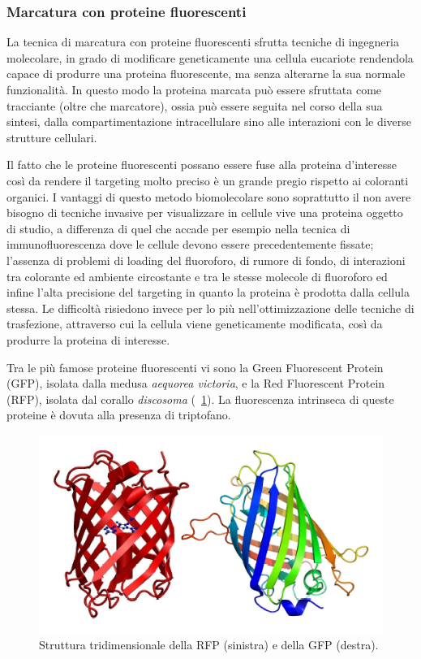 \subsubsection*{Marcatura con proteine fluorescenti}
La tecnica di marcatura con proteine fluorescenti sfrutta tecniche di ingegneria molecolare, in grado di modificare geneticamente una cellula eucariote rendendola capace di produrre una proteina fluorescente, ma senza alterarne la sua normale funzionalità. 
In questo modo la proteina marcata può essere sfruttata come tracciante (oltre che marcatore), ossia può essere seguita nel corso della sua sintesi, dalla compartimentazione intracellulare sino alle interazioni con le diverse strutture cellulari.

Il fatto che le proteine fluorescenti possano essere fuse alla proteina d'interesse così da rendere il targeting molto preciso è un grande pregio rispetto ai coloranti organici. 
I vantaggi di questo metodo biomolecolare sono soprattutto il non avere bisogno di tecniche invasive per visualizzare in cellule vive una proteina oggetto di studio, a differenza di quel che accade per esempio nella tecnica di immunofluorescenza dove le cellule devono essere precedentemente fissate; l'assenza di problemi di loading del fluoroforo, di rumore di fondo, di interazioni tra colorante ed ambiente circostante e tra le stesse molecole di fluoroforo ed infine l'alta precisione del targeting in quanto la proteina è prodotta dalla cellula stessa. 
Le difficoltà risiedono invece per lo più nell'ottimizzazione delle tecniche di trasfezione, attraverso cui la cellula viene geneticamente modificata, così da produrre la proteina di interesse.

Tra le più famose proteine fluorescenti vi sono la Green Fluorescent Protein (GFP), isolata dalla medusa \textit{aequorea victoria}, e la Red Fluorescent Protein (RFP), isolata dal corallo \textit{discosoma} (\figurename~\ref{fig:proteine}). 
La fluorescenza intrinseca di queste proteine è dovuta alla presenza di triptofano.

\begin{figure}
 \centering
 \includegraphics[scale=.50]{img/CAP1proteine.png}
 \caption{\small{ Struttura tridimensionale della RFP (sinistra) e della GFP (destra).}}
 \label{fig:proteine}
\end{figure}

